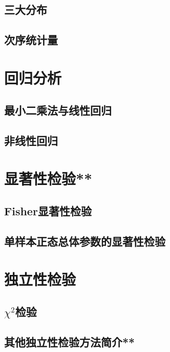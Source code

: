\subsection{三大分布}
\clearpage
\subsection{次序统计量}
\clearpage



\section{回归分析}
\subsection{最小二乘法与线性回归}
\clearpage
\subsection{非线性回归}
\clearpage



\section{显著性检验**}
\subsection{Fisher显著性检验}
\clearpage
\subsection{单样本正态总体参数的显著性检验}
\clearpage


\section{独立性检验}
\subsection{\texorpdfstring{$\chi^2$}a检验}
\clearpage
\subsection{其他独立性检验方法简介**}
\clearpage

